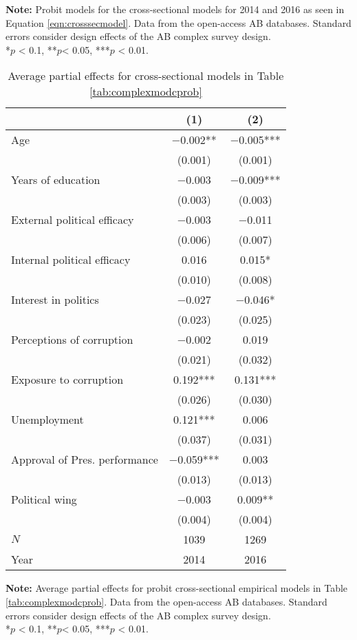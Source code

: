 \documentclass[12pt,a4]{article}
\begin{document}
\begin{table}[htbp]
\begin{center}
\end{center}
\textbf{Note:} Probit models for the cross-sectional models for 2014 and 2016 as seen in Equation \ref{eqn:crosssecmodel}. Data from the open-access AB databases. Standard errors consider design effects of the AB complex survey design.\\
*$p$ < 0.1, **$p$< 0.05, ***$p$ < 0.01.
\end{table}

\begin{table}[htbp]
\begin{center}
\caption{Average partial effects for cross-sectional models in Table \ref{tab:complexmodcprob}}
\label{tab:apecrossprobit}

\begin{tabular}[t]{lcc}
\toprule
  & (1) & (2)\\
\midrule
Age & \num{-0.002}** & \num{-0.005}***\\
 & (\num{0.001}) & (\num{0.001})\\
Years of education & \num{-0.003} & \num{-0.009}***\\
 & (\num{0.003}) & (\num{0.003})\\
External political efficacy & \num{-0.003} & \num{-0.011}\\
 & (\num{0.006}) & (\num{0.007})\\
Internal political efficacy & \num{0.016} & \num{0.015}*\\
 & (\num{0.010}) & (\num{0.008})\\
Interest in politics & \num{-0.027} & \num{-0.046}*\\
 & (\num{0.023}) & (\num{0.025})\\
Perceptions of corruption & \num{-0.002} & \num{0.019}\\
 & (\num{0.021}) & (\num{0.032})\\
Exposure to corruption & \num{0.192}*** & \num{0.131}***\\
 & (\num{0.026}) & (\num{0.030})\\
Unemployment & \num{0.121}*** & \num{0.006}\\
 & (\num{0.037}) & (\num{0.031})\\
Approval of Pres. performance & \num{-0.059}*** & \num{0.003}\\
 & (\num{0.013}) & (\num{0.013})\\
Political wing & \num{-0.003} & \num{0.009}**\\
 & (\num{0.004}) & (\num{0.004})\\
\midrule
$N$ & \num{1039} & \num{1269}\\
Year & 2014 & 2016\\
\bottomrule
\end{tabular}


\end{center}
\textbf{Note:} Average partial effects for probit cross-sectional empirical models in Table \ref{tab:complexmodcprob}. Data from the open-access AB databases. Standard errors consider design effects of the AB complex survey design.\\
*$p$ < 0.1, **$p$< 0.05, ***$p$ < 0.01.
\end{table}
\end{document}
